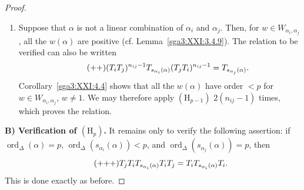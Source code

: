 \begin{proof}
\begin{enumerate}
\item[(2)] Suppose that \(\alpha\) is not a linear combination of
\(\alpha_i\) and \(\alpha_j\). Then, for
\(w\in W_{\alpha_i,\alpha_j}\), all the \(w(\alpha)\) are positive
(cf. Lemma~\ref{sga3:XXI:3.4.9}). The relation to be verified can
also be written
\begin{equation}
\tag{\({+}{+}\)}
\label{sga3:XXI:5.2:rank-two-relation}
 (T_iT_j)^{n_{ij}-1}T_{s_{\alpha_i}(\alpha)}
 (T_jT_i)^{n_{ij}-1}
 =T_{s_{\alpha_j}(\alpha)}.
\end{equation}
Corollary~\ref{sga3:XXI:4.4} shows that all the \(w(\alpha)\) have
order \(<p\) for
\(w\in W_{\alpha_i,\alpha_j}\), \(w\ne1\). We may therefore apply
\((\mathrm{H}_{p-1})\) \(2(n_{ij}-1)\) times, which proves the
relation.
\end{enumerate}

\medskip
\noindent\textbf{B) Verification of \((\mathrm{H}_p)\).}
It remains only to verify the following assertion: if
\(\operatorname{ord}_\Delta(\alpha)=p\),
\(\operatorname{ord}_\Delta(s_{\alpha_i}(\alpha))<p\), and
\(\operatorname{ord}_\Delta(s_{\alpha_j}(\alpha))=p\), then
\begin{equation}
\tag{\({+}{+}{+}\)}
\label{sga3:XXI:5.2:orthogonal-expanded}
 T_jT_iT_{s_{\alpha_i}(\alpha)}T_iT_j
 =T_iT_{s_{\alpha_i}(\alpha)}T_i.
\end{equation}
This is done exactly as before.
\end{proof}
